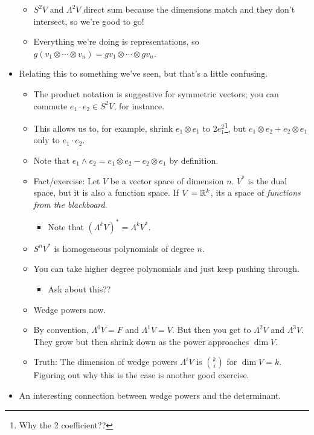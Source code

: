 \documentclass[../notes.tex]{subfiles}
\begin{document}
\begin{itemize}
\begin{itemize}
\begin{itemize}
        \end{itemize}
        \item $S^2V$ and $\Lambda^2V$ direct sum because the dimensions match and they don't intersect, so we're good to go!
        \item Everything we're doing is representations, so $g(v_1\otimes\cdots\otimes v_n)=gv_1\otimes\cdots\otimes gv_n$.
    \end{itemize}
    \item Relating this to something we've seen, but that's a little confusing.
    \begin{itemize}
        \item The product notation is suggestive for symmetric vectors; you can commute $e_1\cdot e_2\in S^2V$, for instance.
        \item This allows us to, for example, shrink $e_1\otimes e_1$ to $2e_1^2$\footnote{Why the 2 coefficient??}, but $e_1\otimes e_2+e_2\otimes e_1$ only to $e_1\cdot e_2$.
        \item Note that $e_1\wedge e_2=e_1\otimes e_2-e_2\otimes e_1$ by definition.
        \item Fact/exercise: Let $V$ be a vector space of dimension $n$. $V^*$ is the dual space, but it is also a function space. If $V=\mathbb{R}^k$, its a space of \emph{functions from the blackboard}.
        \begin{itemize}
            \item Note that $(\Lambda^kV)^*=\Lambda^kV^*$.
        \end{itemize}
        \item $S^nV^*$ is homogeneous polynomials of degree $n$.
        \item You can take higher degree polynomials and just keep pushing through.
        \begin{itemize}
            \item Ask about this??
        \end{itemize}
        \item Wedge powers now.
        \item By convention, $\Lambda^0V=F$ and $\Lambda^1V=V$. But then you get to $\Lambda^2V$ and $\Lambda^3V$. They grow but then shrink down as the power approaches $\dim V$.
        \item Truth: The dimension of wedge powers $\Lambda^iV$ is $\binom{k}{i}$ for $\dim V=k$. Figuring out why this is the case is another good exercise.
    \end{itemize}
    \item An interesting connection between wedge powers and the determinant.

\end{itemize}
\end{document}
